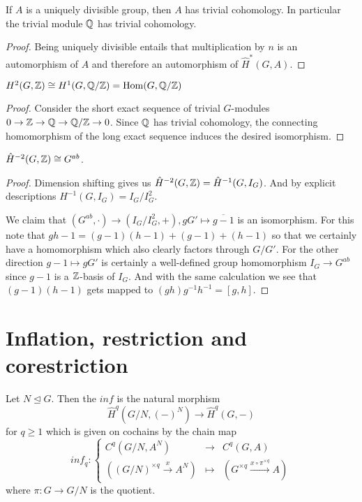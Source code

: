 \documentclass[fontsize=11pt,fleqn,a4paper]{scrartcl}
\begin{document}
\begin{corollary}
If $A$ is a uniquely divisible group, then $A$ has trivial cohomology. In particular the trivial module $\mathbb{Q}$ has trivial cohomology.
\end{corollary}
\begin{proof}
Being uniquely divisible entails that multiplication by $n$ is an automorphism of $A$ and therefore an automorphism of $\hat{H}^\ast(G,A)$.
\end{proof}

\begin{corollary}[$H^1$ and $H^2$]
$H^2(G,\mathbb{Z}) \cong H^1(G,\mathbb{Q}/\mathbb{Z}) = \operatorname{Hom}(G,\mathbb{Q}/\mathbb{Z})$
\end{corollary}
\begin{proof}
Consider the short exact sequence of trivial $G$-modules
$0\to\mathbb{Z}\to\mathbb{Q}\to\mathbb{Q}/\mathbb{Z}\to 0$.
Since $\mathbb{Q}$ has trivial cohomology, the connecting homomorphism of the long exact sequence induces the desired isomorphism.
\end{proof}

\begin{theorem}[$H^{-2}$]
$\hat{H}^{-2}(G,\mathbb{Z}) \cong G^{ab}$.
\end{theorem}
\begin{proof}
Dimension shifting gives us $\hat{H}^{-2}(G,\mathbb{Z}) = \hat{H}^{-1}(G,I_G)$. And by explicit descriptions $H^{-1}(G,I_G) = I_G/I_G^2$.

We claim that $(G^{ab},\cdot) \to (I_G/I_G^2,+), gG'\mapsto \overline{g-1}$ is an isomorphism. For this note that $gh-1 = (g-1)(h-1) + (g-1) + (h-1)$ so that we certainly have a homomorphism which also clearly factors through $G/G'$. For the other direction $g-1 \mapsto gG'$ is certainly a well-defined group homomorphism $I_G \to G^{ab}$ since $g-1$ is a $\mathbb{Z}$-basis of $I_G$. And with the same calculation we see that $(g-1)(h-1)$ gets mapped to $(gh)g^{-1}h^{-1} = [g,h]$.
\end{proof}

\section{Inflation, restriction and corestriction}

\begin{lemmadef}[Inflation]
Let $N\unlhd G$. Then the  $inf$ is the natural morphism
\[\hat{H}^q(G/N,(-)^N) \to \hat{H}^q(G,-)\]
for $q\geq 1$ which is given on cochains by the chain map
\[inf_q: \left\{\begin{array}{rcl}
C^q(G/N,A^N) &\to& C^q(G,A) \\
((G/N)^{\times q} \xrightarrow{x} A^N) &\mapsto& (G^{\times q}\xrightarrow{x\circ\pi^{\times q}} A)
\end{array}\right.\]
where $\pi: G\to G/N$ is the quotient.
\end{lemmadef}
\end{document}
